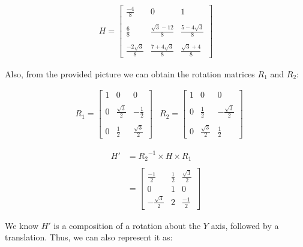 \documentclass[12pt, oneside]{article}
\begin{document}
\begin{align*}
    H =  
    \begin{bmatrix} \frac{-4}{8} & 0 & 1 \\ \\ 
                    \frac{6}{8} & \frac{\sqrt{3} - 12}{8} 
                    & \frac{5 -4\sqrt{3}}{8}    \\ \\ 
                    \frac{-2 \sqrt{3}}{8} & 
                    \frac{7 + 4\sqrt{3}}{8} & \frac{\sqrt{3} + 4}{8} 
                \end{bmatrix} 
\end{align*}

Also, from the provided picture we can obtain the rotation matrices $R_1$ and 
$R_2$:

\begin{align*}
    & R_1 =  
    \begin{bmatrix} 1 & 0 & 0 \\ \\ 
                    0 & \frac{\sqrt{3}}{2} & -\frac{1}{2}\\ \\ 
                    0 & \frac{1}{2} & \frac{\sqrt{3}}{2} \end{bmatrix} 
    & R_2 =  
    \begin{bmatrix} 1 & 0 & 0 \\ \\ 
                    0 & \frac{1}{2} & -\frac{\sqrt{3}}{2}\\ \\ 
                    0 & \frac{\sqrt{3}}{2} & \frac{1}{2} \end{bmatrix} 
\end{align*}


\begin{align*}
    H'  &= {R_2}^{-1} \times H \times R_1 \\ \\
        &=
        \begin{bmatrix} \frac{-1}{2}  & \frac{1}{2} & \frac{\sqrt{3}}{2} \\ 
            0   & 1 & 0 \\ 
            -\frac{\sqrt{3}}{2}  & 2 & \frac{-1}{2} \end{bmatrix} 
\end{align*}

We know $H'$ is a composition of a rotation about the $Y$ axis, followed by a 
translation. Thus, we can also represent it as:
\end{document}
